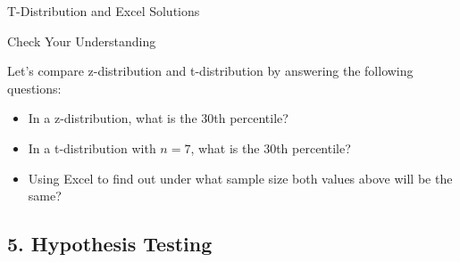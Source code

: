 \documentclass{beamer}
\begin{document}
\begin{frame}{T-Distribution and Excel Solutions}


\begin{table}[]
\end{table}

\end{frame}




\begin{frame}{Check Your Understanding}

Let's compare z-distribution and t-distribution by answering the following questions: 

\begin{itemize}
\item In a z-distribution, what is the 30th percentile?
\item In a t-distribution with $n = 7$, what is the 30th percentile? 
\item Using Excel to find out under what sample size both values above will be the same? 
\end{itemize}




\end{frame}







\subsection{5. Hypothesis Testing}
\end{document}
